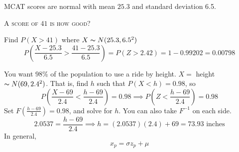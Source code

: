 
MCAT scores are normal with mean $ 25.3 $ and standard deviation 6.5.

\textsc{A score of $ 41 $ is how good?}

Find $ P(X>41) $ where $ X \thicksim N(25.3,6.5^2) $
\[ P\left(\frac{X-25.3}{6.5}>\frac{41-25.3}{6.5}\right)=P(Z>2.42)=1-0.99202=0.00798 \]


You want $ 98\% $ of the population to use a ride by height.
$ X= $ height $ \thicksim N(69,2.4^2) $. That is, find $ h $
such that $ P(X<h)=0.98 $, so
\[ P\left(\frac{X-69}{2.4}<\frac{h-69}{2.4}\right)=0.98\implies P\left(Z<\frac{h-69}{2.4}\right)=0.98\]
Set $F(\frac{h-69}{2.4})=0.98 $, and solve for $ h $. You can also take $ F^{-1} $ on each side.
\[ 2.0537=\frac{h-69}{2.4}\implies h=(2.0537)(2.4)+69=73.93\text{ inches} \]
In general,
\[ x_p=\sigma z_p+\mu \]